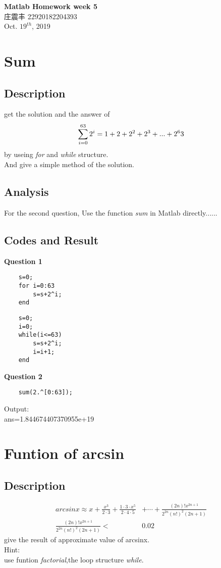 \documentclass[UTF8,a4paper]{article}
\begin{document}
\begin{center}
    \textbf{\LARGE{Matlab Homework week 5}}\\[0.5cm]
    \normalsize{庄震丰 22920182204393}\\[0.5cm]
    \large{Oct. $19^{th}$, 2019}
\end{center}
\section{Sum}
\subsection{Description}
get the solution and the answer of 
$$
    \sum_{i=0}^{63} 2^i=1+2+2^2+2^3+...+2^63\\
$$
by useing \textit{for} and \textit{while} structure.\\
And give a simple method of the solution.
\subsection{Analysis}
For the second question,
Use the function \textit{sum} in Matlab directly......
\subsection{Codes and Result}
\textbf{Question 1}
\begin{lstlisting}
    s=0;
    for i=0:63
        s=s+2^i;
    end
\end{lstlisting}
\begin{lstlisting}
    s=0;
    i=0;
    while(i<=63)
        s=s+2^i;
        i=i+1;
    end
\end{lstlisting}
\textbf{Question 2}
\begin{lstlisting}
    sum(2.^[0:63]);
\end{lstlisting}
Output:\\
ans=1.844674407370955e+19\\
\section{Funtion of arcsin}
\subsection{Description}
$$
\begin{aligned}
    arcsinx\approx x+ \frac{x^3}{2\cdot 3}+\frac{1 \cdot 3 \cdot x^5}{2\cdot 4 \cdot 5}&+\cdots +\frac{(2n)!x^{2n+1}}{2^{2n}(n!)^2(2n+1)}\\
    \frac{(2n)!x^{2n+1}}{2^{2n}(n!)^2(2n+1)}<&0.02 
\end{aligned}
$$
give the result of approximate value of arcsinx.\\
Hint:\\
use funtion \textit{factorial},the loop structure \textit{while}.
\end{document}
